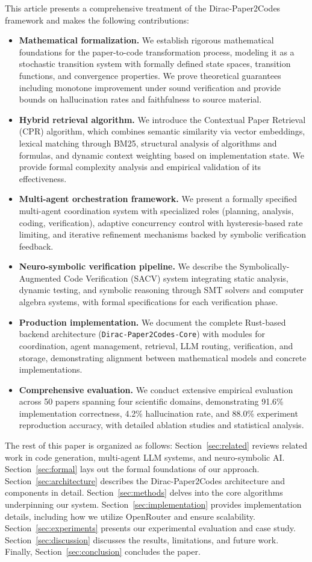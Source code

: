 \documentclass{ieeeaccess}
\begin{document}
This article presents a comprehensive treatment of the Dirac-Paper2Codes framework and makes the following contributions:
\begin{itemize}
\item \textbf{Mathematical formalization.} We establish rigorous mathematical foundations for the paper-to-code transformation process, modeling it as a stochastic transition system with formally defined state spaces, transition functions, and convergence properties. We prove theoretical guarantees including monotone improvement under sound verification and provide bounds on hallucination rates and faithfulness to source material.
\item \textbf{Hybrid retrieval algorithm.} We introduce the Contextual Paper Retrieval (CPR) algorithm, which combines semantic similarity via vector embeddings, lexical matching through BM25, structural analysis of algorithms and formulas, and dynamic context weighting based on implementation state. We provide formal complexity analysis and empirical validation of its effectiveness.
\item \textbf{Multi-agent orchestration framework.} We present a formally specified multi-agent coordination system with specialized roles (planning, analysis, coding, verification), adaptive concurrency control with hysteresis-based rate limiting, and iterative refinement mechanisms backed by symbolic verification feedback.
\item \textbf{Neuro-symbolic verification pipeline.} We describe the Symbolically-Augmented Code Verification (SACV) system integrating static analysis, dynamic testing, and symbolic reasoning through SMT solvers and computer algebra systems, with formal specifications for each verification phase.
\item \textbf{Production implementation.} We document the complete Rust-based backend architecture (\texttt{Dirac-Paper2Codes-Core}) with modules for coordination, agent management, retrieval, LLM routing, verification, and storage, demonstrating alignment between mathematical models and concrete implementations.
\item \textbf{Comprehensive evaluation.} We conduct extensive empirical evaluation across 50 papers spanning four scientific domains, demonstrating 91.6\% implementation correctness, 4.2\% hallucination rate, and 88.0\% experiment reproduction accuracy, with detailed ablation studies and statistical analysis.
\end{itemize}

The rest of this paper is organized as follows: Section~\ref{sec:related} reviews related work in code generation, multi-agent LLM systems, and neuro-symbolic AI. Section~\ref{sec:formal} lays out the formal foundations of our approach. Section~\ref{sec:architecture} describes the Dirac-Paper2Codes architecture and components in detail. Section~\ref{sec:methods} delves into the core algorithms underpinning our system. Section~\ref{sec:implementation} provides implementation details, including how we utilize OpenRouter and ensure scalability. Section~\ref{sec:experiments} presents our experimental evaluation and case study. Section~\ref{sec:discussion} discusses the results, limitations, and future work. Finally, Section~\ref{sec:conclusion} concludes the paper.
\end{document}
